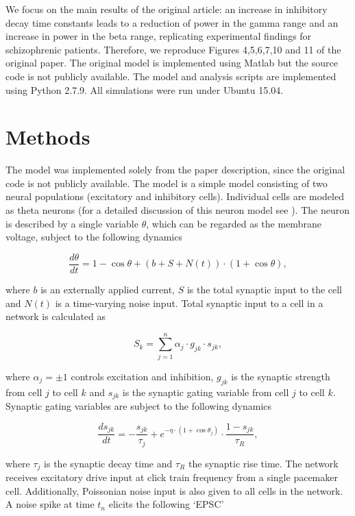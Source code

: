 \documentclass[10pt,a4paper,onecolumn]{article}
\begin{document}
We focus on the main results of the original article: an increase in
inhibitory decay time constants leads to a reduction of power in the
gamma range and an increase in power in the beta range, replicating
experimental findings for schizophrenic patients. Therefore, we
reproduce Figures 4,5,6,7,10 and 11 of the original paper. The original
model is implemented using Matlab but the source code is not publicly
available. The model and analysis scripts are implemented using Python
2.7.9. All simulations were run under Ubuntu 15.04.

\section{Methods}\label{methods}

The model was implemented solely from the paper description, since the
original code is not publicly available. The model is a simple model
consisting of two neural populations (excitatory and inhibitory cells).
Individual cells are modeled as theta neurons (for a detailed discussion
of this neuron model see \autocite{Boergers2003}). The neuron is
described by a single variable \(\theta\), which can be regarded as the
membrane voltage, subject to the following dynamics

\[\frac{d \theta}{dt}=1-\cos \theta + (b+S+N(t))\cdot(1+ \cos \theta),\]

where \(b\) is an externally applied current, \(S\) is the total
synaptic input to the cell and \(N(t)\) is a time-varying noise input.
Total synaptic input to a cell in a network is calculated as

\[S_k = \sum_{j=1}^n \alpha_j \cdot g_{jk} \cdot s_{jk},\]

where \(\alpha _j=\pm 1\) controls excitation and inhibition, \(g_{jk}\)
is the synaptic strength from cell \(j\) to cell \(k\) and \(s_{jk}\) is
the synaptic gating variable from cell \(j\) to cell \(k\). Synaptic
gating variables are subject to the following dynamics

\[\frac{ds_{jk}}{dt}= - \frac{s _{jk}}{\tau _j} + e ^{- \eta \cdot (1+ \cos \theta _j)} \cdot \frac{1-s _{jk}}{\tau _R},\]

where \(\tau _j\) is the synaptic decay time and \(\tau_R\) the synaptic
rise time. The network receives excitatory drive input at click train
frequency from a single pacemaker cell. Additionally, Poissonian noise
input is also given to all cells in the network. A noise spike at time
\(t_n\) elicits the following `EPSC'
\end{document}
